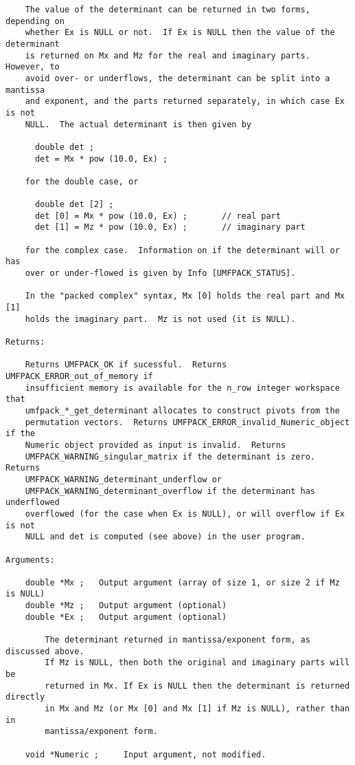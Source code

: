 \documentclass[11pt]{article}
\begin{document}
{\begin{verbatim}
    The value of the determinant can be returned in two forms, depending on
    whether Ex is NULL or not.  If Ex is NULL then the value of the determinant
    is returned on Mx and Mz for the real and imaginary parts.  However, to
    avoid over- or underflows, the determinant can be split into a mantissa
    and exponent, and the parts returned separately, in which case Ex is not
    NULL.  The actual determinant is then given by

      double det ;
      det = Mx * pow (10.0, Ex) ;

    for the double case, or

      double det [2] ;
      det [0] = Mx * pow (10.0, Ex) ;       // real part
      det [1] = Mz * pow (10.0, Ex) ;       // imaginary part

    for the complex case.  Information on if the determinant will or has
    over or under-flowed is given by Info [UMFPACK_STATUS].

    In the "packed complex" syntax, Mx [0] holds the real part and Mx [1]
    holds the imaginary part.  Mz is not used (it is NULL).

Returns:

    Returns UMFPACK_OK if sucessful.  Returns UMFPACK_ERROR_out_of_memory if
    insufficient memory is available for the n_row integer workspace that
    umfpack_*_get_determinant allocates to construct pivots from the
    permutation vectors.  Returns UMFPACK_ERROR_invalid_Numeric_object if the
    Numeric object provided as input is invalid.  Returns
    UMFPACK_WARNING_singular_matrix if the determinant is zero.  Returns
    UMFPACK_WARNING_determinant_underflow or
    UMFPACK_WARNING_determinant_overflow if the determinant has underflowed
    overflowed (for the case when Ex is NULL), or will overflow if Ex is not
    NULL and det is computed (see above) in the user program.

Arguments:

    double *Mx ;   Output argument (array of size 1, or size 2 if Mz is NULL)
    double *Mz ;   Output argument (optional)
    double *Ex ;   Output argument (optional)

        The determinant returned in mantissa/exponent form, as discussed above.
        If Mz is NULL, then both the original and imaginary parts will be
        returned in Mx. If Ex is NULL then the determinant is returned directly
        in Mx and Mz (or Mx [0] and Mx [1] if Mz is NULL), rather than in
        mantissa/exponent form.

    void *Numeric ;     Input argument, not modified.


\end{verbatim}}
\end{document}
